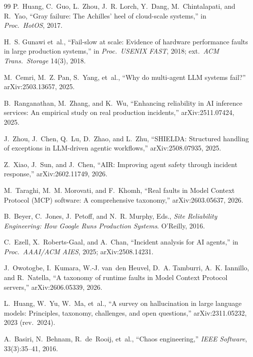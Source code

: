 \documentclass[conference]{IEEEtran}
\begin{document}
\begin{thebibliography}{99}\footnotesize
{}
P.~Huang, C.~Guo, L.~Zhou, J.~R. Lorch, Y.~Dang, M.~Chintalapati, and R.~Yao,
``Gray failure: The Achilles' heel of cloud-scale systems,'' in \emph{Proc.\ HotOS}, 2017.

H.~S. Gunawi et~al., ``Fail-slow at scale: Evidence of hardware performance
faults in large production systems,'' in \emph{Proc.\ USENIX FAST}, 2018; ext.\ \emph{ACM Trans.\ Storage} 14(3), 2018.

M.~Cemri, M.~Z. Pan, S.~Yang, et~al., ``Why do multi-agent LLM systems fail?''
arXiv:2503.13657, 2025.

B.~Ranganathan, M.~Zhang, and K.~Wu, ``Enhancing reliability in AI inference
services: An empirical study on real production incidents,'' arXiv:2511.07424, 2025.

J.~Zhou, J.~Chen, Q.~Lu, D.~Zhao, and L.~Zhu, ``SHIELDA: Structured handling of
exceptions in LLM-driven agentic workflows,'' arXiv:2508.07935, 2025.

Z.~Xiao, J.~Sun, and J.~Chen, ``AIR: Improving agent safety through incident
response,'' arXiv:2602.11749, 2026.

M.~Taraghi, M.~M. Morovati, and F.~Khomh, ``Real faults in Model Context Protocol
(MCP) software: A comprehensive taxonomy,'' arXiv:2603.05637, 2026.

B.~Beyer, C.~Jones, J.~Petoff, and N.~R. Murphy, Eds., \emph{Site Reliability
Engineering: How Google Runs Production Systems}. O'Reilly, 2016.

C.~Ezell, X.~Roberts-Gaal, and A.~Chan, ``Incident analysis for AI agents,'' in
\emph{Proc.\ AAAI/ACM AIES}, 2025; arXiv:2508.14231.

J.~Owotogbe, I.~Kumara, W.-J. van~den Heuvel, D.~A. Tamburri, A.~K. Iannillo, and
R.~Natella, ``A taxonomy of runtime faults in Model Context Protocol servers,'' arXiv:2606.05339, 2026.

L.~Huang, W.~Yu, W.~Ma, et~al., ``A survey on hallucination in large language
models: Principles, taxonomy, challenges, and open questions,'' arXiv:2311.05232, 2023 (rev.\ 2024).

A.~Basiri, N.~Behnam, R.~de~Rooij, et~al., ``Chaos engineering,'' \emph{IEEE
Software}, 33(3):35--41, 2016.


\end{thebibliography}
\end{document}
